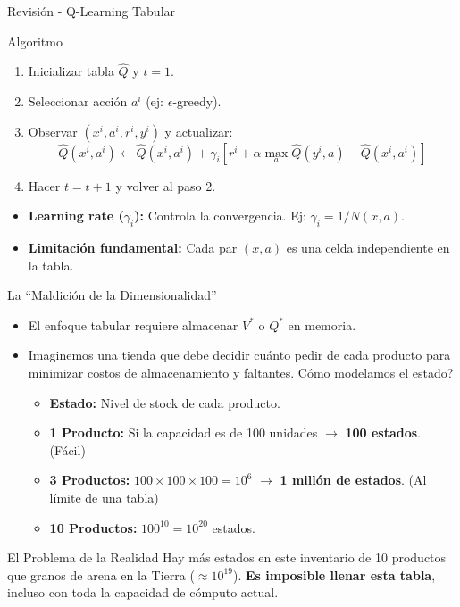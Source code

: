 \documentclass[xcolor=dvipsnames, handout]{beamer}
\begin{document}
\begin{frame}{Revisi\'on - Q-Learning Tabular}
\begin{block}{Algoritmo}
\begin{enumerate}
\item Inicializar tabla $\hat Q$ y $t=1$.
\item Seleccionar acci\'on $a^i$ (ej: $\epsilon$-greedy).
\item Observar $(x^i, a^i, r^i, y^i)$ y actualizar:
{\small
\[ \hat Q(x^i,a^i) \leftarrow \hat Q(x^i,a^i) + \gamma_i \left[ r^i + \alpha \max_{a} \hat Q(y^i, a) - \hat Q(x^i, a^i) \right] \]
}
\item Hacer $t = t+1$ y volver al paso 2.
\end{enumerate}  
\end{block}
\begin{itemize}
\item<2-> \textbf{Learning rate ($\gamma_i$):} Controla la convergencia. Ej: $\gamma_i = 1/N(x,a)$.
\item<3-> \textbf{Limitaci\'on fundamental:} Cada par $(x,a)$ es una celda independiente en la tabla.
\end{itemize}
\end{frame}

\begin{frame}{La “Maldici\'on de la Dimensionalidad”}
\begin{itemize}
\item El enfoque tabular requiere almacenar $V^*$ o $Q^*$ en memoria.
\item<2-> Imaginemos una tienda que debe decidir cu\'anto pedir de cada producto para minimizar costos de almacenamiento y faltantes. \textquestiondown C\'omo modelamos el estado?

\begin{itemize}
    \item<3-> \textbf{Estado:} Nivel de stock de cada producto.
    \item<4-> \textbf{1 Producto:} Si la capacidad es de 100 unidades $\rightarrow$ \textbf{100 estados}. (F\'acil)
    \item<5-> \textbf{3 Productos:} $100 \times 100 \times 100 = 10^6$ $\rightarrow$ \textbf{1 mill\'on de estados}. (Al l\'imite de una tabla)
    \item<6-> \textbf{10 Productos:} $100^{10} = 10^{20}$ estados. 
\end{itemize}
\end{itemize}

\begin{alertblock}{El Problema de la Realidad}
    Hay m\'as estados en este inventario de 10 productos que granos de arena en la Tierra ($\approx 10^{19}$). \textbf{Es imposible llenar esta tabla}, incluso con toda la capacidad de cómputo actual.
\end{alertblock}
\end{frame}
\end{document}
